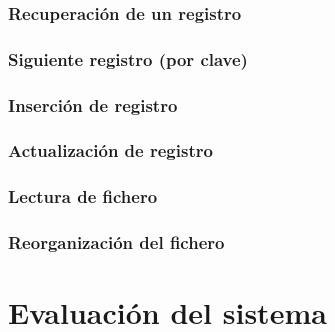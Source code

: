 \subsubsection{Recuperación de un registro}
\subsubsection{Siguiente registro (por clave)}
\subsubsection{Inserción de registro}
\subsubsection{Actualización de registro}
\subsubsection{Lectura de fichero}
\subsubsection{Reorganización del fichero}


\section{Evaluación del sistema}